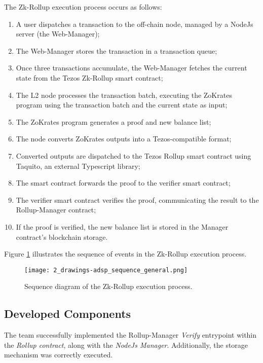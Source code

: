 The Zk-Rollup execution process occurs as follows:
\begin{enumerate}
    \item A user dispatches a transaction to the off-chain node, managed by a NodeJs server (the Web-Manager);
    \item The Web-Manager stores the transaction in a transaction queue;
    \item Once three transactions accumulate, the Web-Manager fetches the current state from the Tezos Zk-Rollup smart contract;
    \item The L2 node processes the transaction batch, executing the ZoKrates program using the transaction batch and the current state as input;
    \item The ZoKrates program generates a proof and new balance list;
    \item The node converts ZoKrates outputs into a Tezos-compatible format;
    \item Converted outputs are dispatched to the Tezos Rollup smart contract using Taquito, an external Typescript library;
    \item The smart contract forwards the proof to the verifier smart contract;
    \item The verifier smart contract verifies the proof, communicating the result to the Rollup-Manager contract;
    \item If the proof is verified, the new balance list is stored in the Manager contract's blockchain storage.
\end{enumerate}

Figure \ref{fig:3_drawings-adsp_sequence_general.png} illustrates the sequence of events in the Zk-Rollup execution process.

\begin{figure}[ht]
  \centering
  \texttt{[image: 2\_drawings-adsp\_sequence\_general.png]}
  \caption[Sequence Zk-Rollup]{Sequence diagram of the Zk-Rollup execution process.}  
  \label{fig:3_drawings-adsp_sequence_general.png}
\end{figure} 

\subsection{Developed Components}
The team successfully implemented the Rollup-Manager \textit{Verify} entrypoint within the \textit{Rollup contract}, along with the \textit{NodeJs Manager}. Additionally, the storage mechanism was correctly executed.

